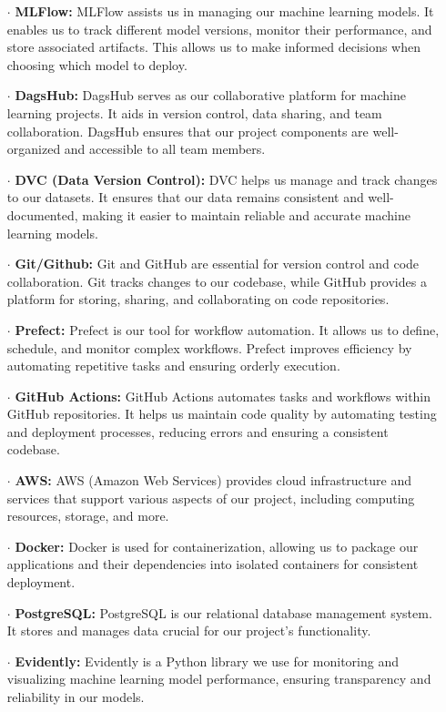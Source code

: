 \documentclass{report}
\begin{document}
\begin{itemize}
    \item[$\cdot$] \textbf{MLFlow:} MLFlow assists us in managing our machine learning models. It enables us to track different model versions, monitor their performance, and store associated artifacts. This allows us to make informed decisions when choosing which model to deploy.
    
    \item[$\cdot$] \textbf{DagsHub:} DagsHub serves as our collaborative platform for machine learning projects. It aids in version control, data sharing, and team collaboration. DagsHub ensures that our project components are well-organized and accessible to all team members.
    
    \item[$\cdot$] \textbf{DVC (Data Version Control):} DVC helps us manage and track changes to our datasets. It ensures that our data remains consistent and well-documented, making it easier to maintain reliable and accurate machine learning models.
    
    \item[$\cdot$] \textbf{Git/Github:} Git and GitHub are essential for version control and code collaboration. Git tracks changes to our codebase, while GitHub provides a platform for storing, sharing, and collaborating on code repositories.
    
    \item[$\cdot$] \textbf{Prefect:} Prefect is our tool for workflow automation. It allows us to define, schedule, and monitor complex workflows. Prefect improves efficiency by automating repetitive tasks and ensuring orderly execution.

    \item[$\cdot$] \textbf{GitHub Actions:} GitHub Actions automates tasks and workflows within GitHub repositories. It helps us maintain code quality by automating testing and deployment processes, reducing errors and ensuring a consistent codebase.

    \item[$\cdot$] \textbf{AWS:} AWS (Amazon Web Services) provides cloud infrastructure and services that support various aspects of our project, including computing resources, storage, and more.

    \item[$\cdot$] \textbf{Docker:} Docker is used for containerization, allowing us to package our applications and their dependencies into isolated containers for consistent deployment.

    \item[$\cdot$] \textbf{PostgreSQL:} PostgreSQL is our relational database management system. It stores and manages data crucial for our project's functionality.

    \item[$\cdot$] \textbf{Evidently:} Evidently is a Python library we use for monitoring and visualizing machine learning model performance, ensuring transparency and reliability in our models.
\end{itemize}
\end{document}
